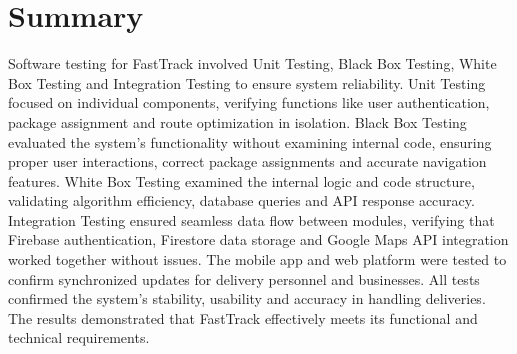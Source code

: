 \section{Summary}
Software testing for FastTrack involved Unit Testing, Black Box Testing, White Box Testing and
Integration Testing to ensure system reliability. Unit Testing focused on individual components,
verifying functions like user authentication, package assignment and route optimization in isolation.
Black Box Testing evaluated the system’s functionality without examining internal code, ensuring
proper user interactions, correct package assignments and accurate navigation features. White Box
Testing examined the internal logic and code structure, validating algorithm efficiency, database
queries and API response accuracy. Integration Testing ensured seamless data flow between
modules, verifying that Firebase authentication, Firestore data storage and Google Maps API
integration worked together without issues. The mobile app and web platform were tested to confirm
synchronized updates for delivery personnel and businesses. All tests confirmed the system’s stability,
usability and accuracy in handling deliveries. The results demonstrated that FastTrack effectively
meets its functional and technical requirements.